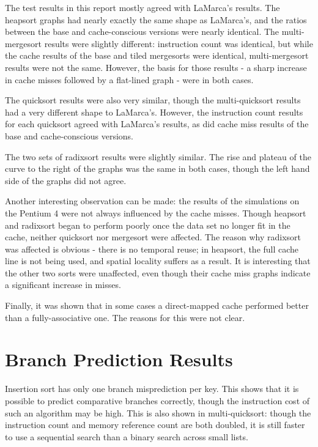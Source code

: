 The test results in this report mostly agreed with LaMarca's results. The
heapsort graphs had nearly exactly the same shape as LaMarca's, and the ratios
between the base and cache-conscious versions were nearly identical. The
multi-mergesort results were slightly different: instruction count was
identical, but while the cache results of the base and tiled mergesorts were
identical, multi-mergesort results were not the same. However, the basis for
those results - a sharp increase in cache misses followed by a flat-lined graph
- were in both cases.

The quicksort results were also very similar, though the multi-quicksort results
had a very different shape to LaMarca's. However, the instruction count
results for each quicksort agreed with LaMarca's results, as did cache miss
results of the base and cache-conscious versions.

The two sets of radixsort results were slightly similar. The rise and plateau of
the curve to the right of the graphs was the same in both cases, though the left
hand side of the graphs did not agree.

Another interesting observation can be made: the results of the simulations on
the Pentium 4 were not always influenced by the cache misses. Though heapsort
and radixsort began to perform poorly once the data set no longer fit in the
cache, neither quicksort nor mergesort were affected. The reason why radixsort
was affected is obvious - there is no temporal reuse; in heapsort, the full
cache line is not being used, and spatial locality suffers as a result. It is
interesting that the other two sorts were unaffected, even though their cache
miss graphs indicate a significant increase in misses.

Finally, it was shown that in some cases a direct-mapped cache performed better
than a fully-associative one. The reasons for this were not clear.

\section{Branch Prediction Results}

Insertion sort has only one branch misprediction per key. This shows that it is
possible to predict comparative branches correctly, though the instruction cost
of such an algorithm may be high. This is also shown in multi-quicksort: though
the instruction count and memory reference count are both doubled, it is still
faster to use a sequential search than a binary search across small lists.

